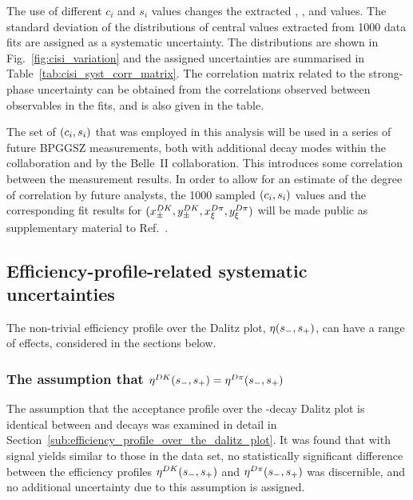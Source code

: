 The use of different $c_i$ and $s_i$ values changes the extracted \xpmdk, \ypmdk, \xxidpi and \yxidpi values. The standard deviation of the distributions of central values extracted from 1000 data fits are assigned as a systematic uncertainty. The distributions are shown in Fig.~\ref{fig:cisi_variation} and the assigned uncertainties are summarised in Table~\ref{tab:cisi_syst_corr_matrix}. The correlation matrix related to the strong-phase uncertainty can be obtained from the correlations observed between observables in the fits, and is also given in the table. 

The set of $(c_i, s_i)$ that was employed in this analysis will be used in a series of future BPGGSZ measurements, both with additional \B decay modes within the \lhcb collaboration and by the Belle~II collaboration. This introduces some correlation between the measurement results. In order to allow for an estimate of the degree of correlation by future analysts, the 1000 sampled $(c_i,s_i)$ values and the corresponding fit results for $(x_\pm^{{D}{K}}, y_\pm^{{D}{K}}, x_\xi^{{D}\pi}, y_\xi^{{D}\pi})$ will be made public as supplementary material to Ref.~\cite{GGSZ-B2Dh}.






\subsection{Efficiency-profile-related systematic uncertainties} %
\label{sub:efficiency_profile_related_systematic_uncertainties}

The non-trivial efficiency profile over the Dalitz plot, $\eta(s_-, s_+)$, can have a range of effects, considered in the sections below.


\subsubsection{The assumption that \texorpdfstring{$\eta^{{D}{K}}(s_-, s_+) = \eta^{{D}\pi}(s_-, s_+)$}{etaDK = etaDpi}}

The assumption that the acceptance profile  over the \D-decay Dalitz plot is identical between \BtoDK and \BtoDpi decays was examined in detail in Section~\ref{sub:efficiency_profile_over_the_dalitz_plot}. It was found that with signal yields similar to those in the data set, no statistically significant difference between the efficiency profiles $\eta^{{D}{K}}(s_-, s_+)$  and $\eta^{{D}\pi}(s_-, s_+)$ was discernible, and no additional uncertainty due to this assumption is assigned.

